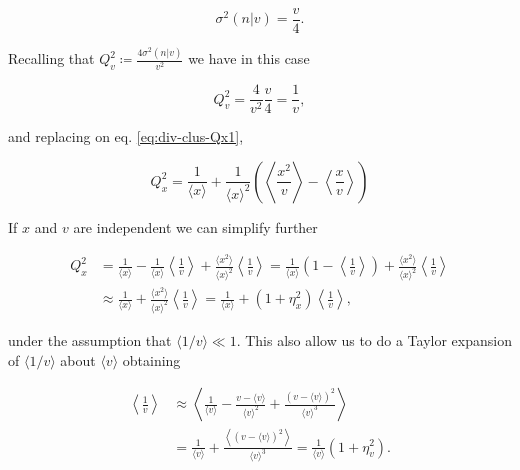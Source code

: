 \begin{equation*}
  \sigma^2(n|v) = \frac{v}{4}.
\end{equation*}

Recalling that $Q_v^2 \coloneqq \frac{4\sigma^2(n|v)}{v^2}$ we have in this case

\begin{equation*}
  Q_v^2 = \frac{4}{v^2}\frac{v}{4} = \frac{1}{v},
\end{equation*}

and replacing on eq. \eqref{eq:div-clus-Qx1},

\begin{equation}
  \label{eq:div-clus-Qx2}
  Q_x^2 = \frac{1}{\langle x\rangle} + \frac{1}{\langle x\rangle^2}\left(\left\langle \frac{x^2}{v}\right\rangle-\left\langle \frac{x}{v}\right\rangle \right)
\end{equation}

If $x$ and $v$ are independent we can simplify further

\begin{equation}
  \label{eq:div-Qx_vesic_almost}
  \begin{split}
    Q_x^2 &= \frac{1}{\langle x\rangle} - \frac{1}{\langle x\rangle}\left\langle\frac{1}{v}\right\rangle + \frac{\langle x^2\rangle}{\langle x\rangle^2}\left\langle\frac{1}{v}\right\rangle = \frac{1}{\langle x\rangle}\left(1-\left\langle\frac{1}{v}\right\rangle\right)+\frac{\langle x^2\rangle}{\langle x\rangle^2}\left\langle\frac{1}{v}\right\rangle\\
  &\approx \frac{1}{\langle x\rangle} + \frac{\langle x^2\rangle}{\langle x\rangle^2}\left\langle\frac{1}{v}\right\rangle = \frac{1}{\langle x\rangle} + \left(1+\eta_x^2\right)\left\langle\frac{1}{v}\right\rangle,
  \end{split}
\end{equation}

under the assumption that $\langle 1/v\rangle \ll 1$. This also allow us to do a Taylor expansion of $\langle 1/v\rangle$ about $\langle v\rangle$ obtaining

\begin{equation*}
  \begin{split}
    \left\langle\frac{1}{v}\right\rangle &\approx \left\langle \frac{1}{\langle v\rangle} - \frac{v-\langle v\rangle}{\langle v\rangle^2} + \frac{(v-\langle v\rangle)^2}{\langle v\rangle^3}\right\rangle\\
    &=\frac{1}{\langle v\rangle} + \frac{\left\langle(v-\langle v\rangle)^2\right\rangle}{\langle v\rangle^3} = \frac{1}{\langle v\rangle}\left(1+\eta_v^2\right).
  \end{split}
\end{equation*}

